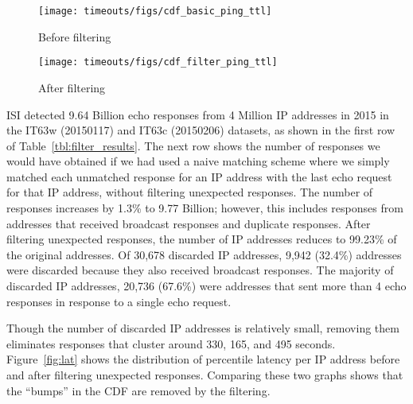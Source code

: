 \begin{figure*}[tb]
\begin{subfigure}[t]{0.47\linewidth}
\centering
\texttt{[image: timeouts/figs/cdf\_basic\_ping\_ttl]}
\caption{
\label{fig:basic_lat}
Before filtering
}
\end{subfigure}
%
\hfill
%
\begin{subfigure}[t]{0.47\linewidth}
\centering
\texttt{[image: timeouts/figs/cdf\_filter\_ping\_ttl]}
\caption{
\label{fig:filter_lat}
After filtering
}
\end{subfigure}
\caption[Filtering unexpected responses is effective]{
\label{fig:lat} 
CDF of Percentile latency per IP address before and after filtering
  unexpected responses. Each point represents an IP address and each
  color represents the percentile from that IP address's response
  latencies. Before filtering unexpected responses, there are
  bumps caused by broadcast responses at 330s, 165s and 495s,
  fractions of the 11 minute (660s) probing interval.
}
\end{figure*}


ISI detected 9.64 Billion echo responses from 4 Million IP addresses in 2015
in the IT63w (20150117) and IT63c (20150206) datasets, as shown in the
first row of Table~\ref{tbl:filter_results}.
The next row shows the number of responses we would have obtained
if we had used a naive matching scheme where we simply matched each
unmatched response for an IP address with the last echo request for
that IP
address, without filtering unexpected responses.
The number of responses
increases by 1.3\% to 9.77 Billion; however, this includes responses
from addresses that received broadcast responses and duplicate
responses. 
%
After filtering unexpected responses, the number of IP addresses
reduces to 99.23\% of
the original addresses. 
%
Of 30,678 discarded IP addresses, 9,942 (32.4\%)
addresses were discarded because they also received broadcast
responses. 
%
The majority of discarded IP addresses, 20,736 (67.6\%) were addresses that
sent more than 4 echo responses in response to a single echo request. 

Though the number of discarded IP addresses is relatively small, removing
them eliminates responses that cluster around 330, 165, and 495 seconds.
Figure~\ref{fig:lat} shows the distribution of percentile latency per
IP address before and after filtering unexpected responses.  Comparing
these two graphs shows that the ``bumps'' in the CDF are removed by the filtering.

